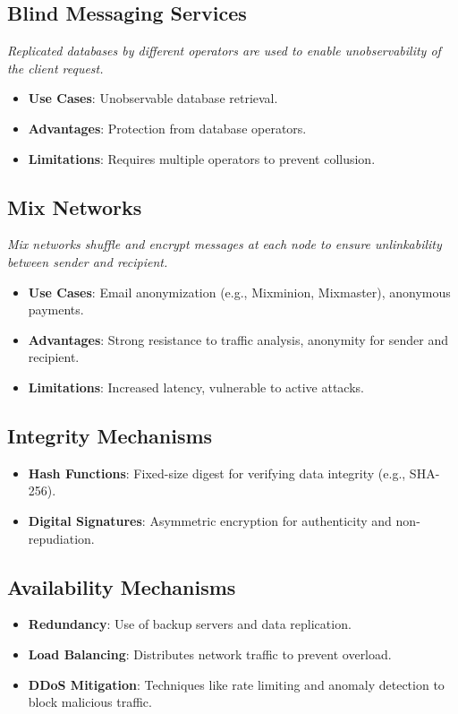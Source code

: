 \documentclass{article}
\begin{document}
\subsection{Blind Messaging Services}
\textit{Replicated databases by different operators are used to enable unobservability of the client request.}
\begin{itemize}
  \item \textbf{Use Cases}: Unobservable database retrieval.
  \item \textbf{Advantages}: Protection from database operators.
  \item \textbf{Limitations}: Requires multiple operators to prevent collusion.
\end{itemize}

\subsection{Mix Networks}
\textit{Mix networks shuffle and encrypt messages at each node to ensure unlinkability between sender and recipient.}
\begin{itemize}
  \item \textbf{Use Cases}: Email anonymization (e.g., Mixminion, Mixmaster), anonymous payments.
  \item \textbf{Advantages}: Strong resistance to traffic analysis, anonymity for sender and recipient.
  \item \textbf{Limitations}: Increased latency, vulnerable to active attacks.
\end{itemize}

\subsection{Integrity Mechanisms}
\begin{itemize}
  \item \textbf{Hash Functions}: Fixed-size digest for verifying data integrity (e.g., SHA-256).
  \item \textbf{Digital Signatures}: Asymmetric encryption for authenticity and non-repudiation.
\end{itemize}

\subsection{Availability Mechanisms}
\begin{itemize}
  \item \textbf{Redundancy}: Use of backup servers and data replication.
  \item \textbf{Load Balancing}:  Distributes network traffic to prevent overload.
  \item \textbf{DDoS Mitigation}:  Techniques like rate limiting and anomaly detection to block malicious traffic.
\end{itemize}
\end{document}
